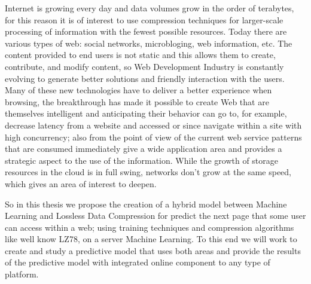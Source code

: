 

Internet is growing every day and data volumes grow in the order of 
terabytes, for this reason it is of interest to use compression 
techniques for larger-scale processing of information with the fewest 
possible resources. Today there are various types of web: social networks, microbloging, web information, etc. The content provided to end 
users is not static and this allows them to create, contribute, and 
modify content, so Web Development Industry is constantly evolving to generate 
better solutions and friendly interaction with the users. 
Many of these new technologies have to deliver a better experience when browsing, the breakthrough has made it possible to create Web that are themselves intelligent and anticipating their behavior can go to, for example, decrease latency from a website and accessed or since navigate within a site with high concurrency; also from the point of view of the current web service patterns that are consumed immediately give a wide application area and provides a strategic aspect to the use of the information. While the growth of storage resources in the cloud is in full swing, networks don't grow at the same speed, which gives an area of interest to deepen.


So in this thesis we  propose the creation of a hybrid model between Machine Learning and Lossless Data Compression  for predict the next page that some user can access within a web; using training techniques and compression algorithms like well know LZ78, on a server Machine Learning. To this end we will work to create and study a predictive model that uses both areas and provide the results of the predictive model with integrated online component to any type of platform.